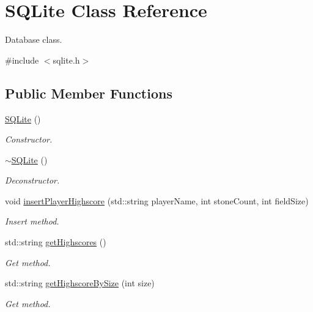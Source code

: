 \hypertarget{classSQLite}{\section{S\+Q\+Lite Class Reference}
\label{classSQLite}
}


Database class.  




{\ttfamily \#include $<$sqlite.\+h$>$}

\subsection*{Public Member Functions}
\begin{DoxyCompactItemize}
\item 
\hypertarget{classSQLite_ae7b35dc7e3c41543a0acde669ad4ba0d}{\hyperlink{classSQLite_ae7b35dc7e3c41543a0acde669ad4ba0d}{S\+Q\+Lite} ()}\label{classSQLite_ae7b35dc7e3c41543a0acde669ad4ba0d}

\begin{DoxyCompactList}\small\item\em Constructor. \end{DoxyCompactList}\item 
\hypertarget{classSQLite_a5b30b82149fe1cc07046f25a9935747f}{\hyperlink{classSQLite_a5b30b82149fe1cc07046f25a9935747f}{$\sim$\+S\+Q\+Lite} ()}\label{classSQLite_a5b30b82149fe1cc07046f25a9935747f}

\begin{DoxyCompactList}\small\item\em Deconstructor. \end{DoxyCompactList}\item 
void \hyperlink{classSQLite_a8d80873b93e5df5cad36e06ed2f20029}{insert\+Player\+Highscore} (std\+::string player\+Name, int stone\+Count, int field\+Size)
\begin{DoxyCompactList}\small\item\em Insert method. \end{DoxyCompactList}\item 
std\+::string \hyperlink{classSQLite_a926d09cf749d8f28dda24c9201a6db38}{get\+Highscores} ()
\begin{DoxyCompactList}\small\item\em Get method. \end{DoxyCompactList}\item 
std\+::string \hyperlink{classSQLite_a2a38752e1a839bf2895c6f19ab82d913}{get\+Highscore\+By\+Size} (int size)
\begin{DoxyCompactList}\small\item\em Get method. \end{DoxyCompactList}\end{DoxyCompactItemize}


